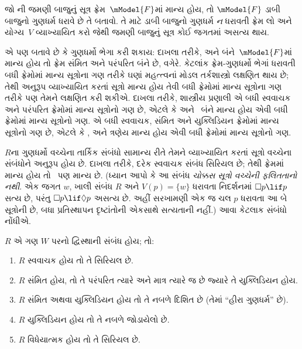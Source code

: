 \begin{prob}
જો ની જમણી
બાજુનું સૂત્ર ફ્રેમ~$\mModel{F}$માં માન્ય હોય,
તો $\mModel{F}$ ડાબી બાજુનો ગુણધર્મ ધરાવે છે તે
બતાવો. તે માટે ડાબી બાજુનો ગુણધર્મ \emph{ન} ધરાવતી
ફ્રેમ લો અને યોગ્ય~$V$ વ્યાખ્યાયિત કરો જેથી
જમણી બાજુનું સૂત્ર કોઈ જગતમાં અસત્ય થાય.
\end{prob}

 એ પણ બતાવે છે કે
ગુણધર્મો ભેગા કરી શકાય: દાખલા તરીકે, 
અને  બંને~$\mModel{F}$માં માન્ય હોય તો ફ્રેમ
સંમિત અને પરંપરિત બંને છે, વગેરે. કેટલાંક
ફ્રેમ-ગુણધર્મો ભેગાં ધરાવતી બધી ફ્રેમોમાં માન્ય
સૂત્રોના ગણ તરીકે ઘણાં મહત્ત્વનાં મોડલ
તર્કશાસ્ત્રો લક્ષણિત થાય છે; તેથી અનુરૂપ વ્યાખ્યાયિત
કરતાં સૂત્રો માન્ય હોય તેવી બધી ફ્રેમોમાં
માન્ય સૂત્રોના ગણ તરીકે પણ તેમને લક્ષણિત
કરી શકીએ. દાખલા તરીકે, શાસ્ત્રીય પ્રણાલી
 એ બધી સ્વવાચક અને પરંપરિત ફ્રેમોમાં
માન્ય સૂત્રોનો ગણ છે, એટલે કે 
અને~ બંને માન્ય હોય એવી બધી ફ્રેમોમાં
માન્ય સૂત્રોનો ગણ.  એ બધી સ્વવાચક,
સંમિત અને યુક્લિડિયન ફ્રેમોમાં માન્ય સૂત્રોનો ગણ છે,
એટલે કે ,  અને  ત્રણેય
માન્ય હોય એવી બધી ફ્રેમોમાં માન્ય સૂત્રોનો ગણ.

$R$ના ગુણધર્મો વચ્ચેના તાર્કિક સંબંધો સામાન્ય રીતે
તેમને વ્યાખ્યાયિત કરતાં સૂત્રો વચ્ચેના સંબંધોને
અનુરૂપ હોય છે. દાખલા તરીકે, દરેક સ્વવાચક સંબંધ
સિરિયલ છે; તેથી ફ્રેમમાં  માન્ય હોય તો~
પણ માન્ય છે. (ધ્યાન આપો કે આ સંબંધ
\emph{ચોક્કસ સૂત્રો વચ્ચેની ફલિતતાનો નથી}.
એક જગત $w$, ખાલી સંબંધ $R$ અને $V(p)=\{w\}$
ધરાવતા નિદર્શનમાં $\Box p \lif p$ સત્ય છે,
પરંતુ $\Box p \lif \Diamond p$ અસત્ય છે.
અહીં સરખામણી એક જ ચલ $p$ ધરાવતા આ બે સૂત્રોની છે,
બધા પ્રતિસ્થાપન દૃષ્ટાંતોની એકસાથે સત્યતાની નહીં.)
આવા કેટલાક સંબંધો નોંધીએ.

\begin{prop}
  $R$ એ ગણ $W$ પરનો દ્વિસ્થાની સંબંધ હોય; તો:
  \begin{enumerate}
  \item $R$ સ્વવાચક હોય તો તે સિરિયલ છે.
  \item $R$ સંમિત હોય, તો તે પરંપરિત ત્યારે અને માત્ર
    ત્યારે જ છે જ્યારે તે યુક્લિડિયન હોય.
  \item $R$ સંમિત અથવા યુક્લિડિયન હોય તો તે
    નબળે દિશિત છે (તેમાં ``હીરા ગુણધર્મ'' છે).
  \item $R$ યુક્લિડિયન હોય તો તે નબળે જોડાયેલો છે.
  \item $R$ વિધેયાત્મક હોય તો તે સિરિયલ છે.
  \end{enumerate}
\end{prop}

